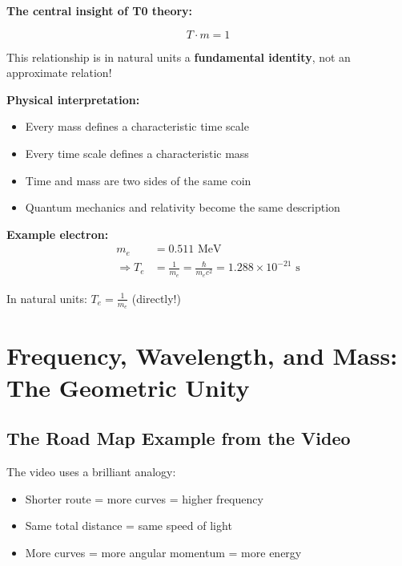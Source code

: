 	\begin{vorteil}
		\textbf{The central insight of T0 theory:}
		
		\begin{equation}
			\boxed{T \cdot m = 1}
		\end{equation}
		
		This relationship is in natural units a \textbf{fundamental identity}, not an approximate relation!
		
		\textbf{Physical interpretation:}
		\begin{itemize}
			\item Every mass defines a characteristic time scale
			\item Every time scale defines a characteristic mass
			\item Time and mass are two sides of the same coin
			\item Quantum mechanics and relativity become the same description
		\end{itemize}
		
		\textbf{Example electron:}
		\begin{align}
			m_e &= 0.511 \text{ MeV} \\
			\Rightarrow T_e &= \frac{1}{m_e} = \frac{\hbar}{m_e c^2} = 1.288 \times 10^{-21} \text{ s}
		\end{align}
		
		In natural units: $T_e = \frac{1}{m_e}$ (directly!)
	\end{vorteil}
	
	\section{Frequency, Wavelength, and Mass: The Geometric Unity}
	
	\subsection{The Road Map Example from the Video}
	
	The video uses a brilliant analogy:
	\begin{itemize}
		\item Shorter route = more curves = higher frequency
		\item Same total distance = same speed of light
		\item More curves = more angular momentum = more energy
	\end{itemize}
	
